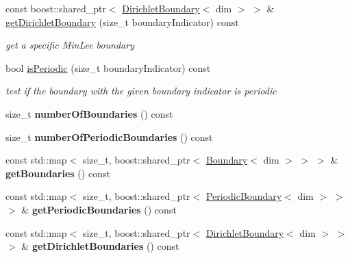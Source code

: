 \begin{DoxyCompactItemize}
const boost::shared\_\-ptr$<$ \hyperlink{classnatrium_1_1DirichletBoundary}{DirichletBoundary}$<$ dim $>$ $>$ \& \hyperlink{classnatrium_1_1BoundaryCollection_a26c06388387177b5272425c53d00fefa}{getDirichletBoundary} (size\_\-t boundaryIndicator) const 
\begin{DoxyCompactList}\small\item\em get a specific MinLee boundary \item\end{DoxyCompactList}\item 
\hypertarget{classnatrium_1_1BoundaryCollection_aec4a9de4aaccaa7a49e5308bf9812c66}{
bool \hyperlink{classnatrium_1_1BoundaryCollection_aec4a9de4aaccaa7a49e5308bf9812c66}{isPeriodic} (size\_\-t boundaryIndicator) const }
\label{classnatrium_1_1BoundaryCollection_aec4a9de4aaccaa7a49e5308bf9812c66}

\begin{DoxyCompactList}\small\item\em test if the boundary with the given boundary indicator is periodic \item\end{DoxyCompactList}\item 
\hypertarget{classnatrium_1_1BoundaryCollection_ad9dbba7ffccaa31ee79cace73197148e}{
size\_\-t {\bfseries numberOfBoundaries} () const }
\label{classnatrium_1_1BoundaryCollection_ad9dbba7ffccaa31ee79cace73197148e}

\item 
\hypertarget{classnatrium_1_1BoundaryCollection_a62004be7508761795d894ed7ca7e4eb8}{
size\_\-t {\bfseries numberOfPeriodicBoundaries} () const }
\label{classnatrium_1_1BoundaryCollection_a62004be7508761795d894ed7ca7e4eb8}

\item 
\hypertarget{classnatrium_1_1BoundaryCollection_a3c7a2ed26b19c2650c91e89052f94025}{
const std::map$<$ size\_\-t, boost::shared\_\-ptr$<$ \hyperlink{classnatrium_1_1Boundary}{Boundary}$<$ dim $>$ $>$ $>$ \& {\bfseries getBoundaries} () const }
\label{classnatrium_1_1BoundaryCollection_a3c7a2ed26b19c2650c91e89052f94025}

\item 
\hypertarget{classnatrium_1_1BoundaryCollection_a280f2769a647610ee330205e8038239c}{
const std::map$<$ size\_\-t, boost::shared\_\-ptr$<$ \hyperlink{classnatrium_1_1PeriodicBoundary}{PeriodicBoundary}$<$ dim $>$ $>$ $>$ \& {\bfseries getPeriodicBoundaries} () const }
\label{classnatrium_1_1BoundaryCollection_a280f2769a647610ee330205e8038239c}

\item 
\hypertarget{classnatrium_1_1BoundaryCollection_afbe2236166ee00df6a079e0aa15cf396}{
const std::map$<$ size\_\-t, boost::shared\_\-ptr$<$ \hyperlink{classnatrium_1_1DirichletBoundary}{DirichletBoundary}$<$ dim $>$ $>$ $>$ \& {\bfseries getDirichletBoundaries} () const }
\label{classnatrium_1_1BoundaryCollection_afbe2236166ee00df6a079e0aa15cf396}

\end{DoxyCompactItemize}


